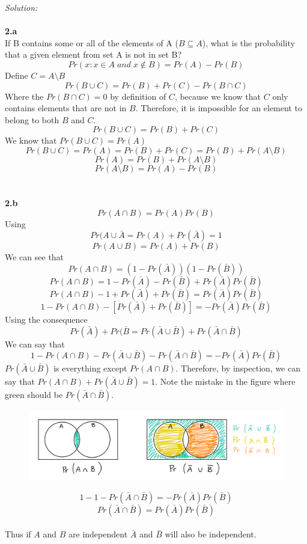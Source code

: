 \documentclass[10pt]{article}
\begin{document}
{\em Solution:}   
\\
\\
{\bf 2.a} \\
If B contains some or all of the elements of A (\( B \subseteq A \)), what is the probability that a given element from set A is not in set B? \\
\[ Pr(x:x \in A \;and\; x\not\in B) = Pr(A)-Pr(B) \]
Define $C=A\setminus B$
\[ Pr(B \cup C)= Pr(B)+Pr(C)-Pr(B \cap C) \]
Where the \( Pr(B \cap C)=0 \) by definition of $C$, because we know that $C$ only contains elements that are not in $B$. Therefore, it is impossible for an element to belong to both $B$ and $C$. 
\[ Pr(B \cup C)=Pr(B)+Pr(C) \]
We know that $ Pr(B \cup C)=Pr(A)$
\[ Pr(B \cup C)=Pr(A)=Pr(B)+Pr(C)=Pr(B)+Pr(A\setminus B) \]
\[ Pr(A)=Pr(B)+Pr(A\setminus B) \]
\[ Pr(A\setminus B)=Pr(A)-Pr(B) \]
\\
\\
{\bf 2.b}
\\
\[ Pr(A\cap B)=Pr(A)Pr(B) \]
Using
\[ Pr(A \cup {\bar A}=Pr(A)+Pr(\bar{A})=1 \]
\[ Pr(A \cup B) = Pr(A)+Pr(B) \]
We can see that
\[ Pr(A \cap B) = (1-Pr({\bar A}))(1-Pr({\bar B})) \]
\[ Pr(A \cap B) = 1 - Pr(\bar{A})-Pr(\bar{B})+Pr(\bar{A})Pr(\bar{B}) \]
\[ Pr(A \cap B) - 1 +  Pr(\bar{A}) + Pr(\bar{B})=Pr(\bar{A})Pr(\bar{B}) \]
\[ 1-Pr(A \cap B) -\left[ Pr(\bar{A}) + Pr(\bar{B}) \right] =-Pr(\bar{A})Pr(\bar{B}) \]
Using the consequence
\[ Pr(\bar{A}) + Pr(\bar{B} = Pr(\bar{A} \cup \bar{B}) +Pr(\bar{A} \cap \bar{B})  \]
We can say that
\[ 1-Pr(A \cap B) - Pr(\bar{A} \cup \bar{B}) -Pr(\bar{A} \cap \bar{B}) =-Pr(\bar{A})Pr(\bar{B}) \]
$Pr(\bar{A} \cup \bar{B})$ is everything except $Pr(A\cap B)$. Therefore, by inspection, we can say that $Pr(A\cap B) + Pr(\bar{A} \cup \bar{B}) = 1$. Note the mistake in the figure where green should be $Pr(\bar{A} \cap \bar{B})$.

\begin{figure} [H]
\includegraphics [width=6in] {CBE660_HW9_3.png}
\end{figure}

\[ 1-1-Pr(\bar{A} \cap \bar{B}) =-Pr(\bar{A})Pr(\bar{B}) \]
\[ Pr(\bar{A} \cap \bar{B}) =Pr(\bar{A})Pr(\bar{B}) \]
\\
Thus if $A$ and $B$ are independent $\bar{A}$ and $\bar{B}$ will also be independent. 
\end{document}
